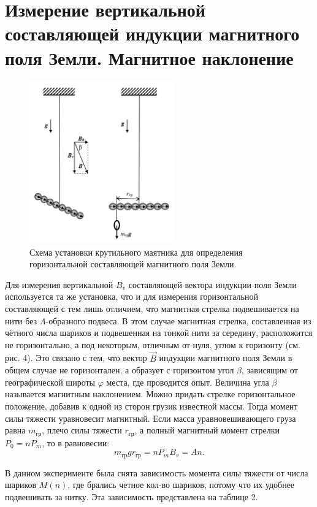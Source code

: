 \documentclass[a4paper, 14pt]{extarticle}%
\newcommand\ECaption[1]{%
     \captionsetup{font=footnotesize}%
     \caption{#1}}
\begin{document}
\section*{Измерение вертикальной составляющей
индукции магнитного поля Земли.
Магнитное наклонение}

\begin{figure}
\begin{center}
\includegraphics[height=7cm]{vert.png}
\end{center}
\ECaption{Схема установки крутильного маятника для определения горизонтальной составляющей магнитного поля Земли.}
\end{figure}

Для измерения вертикальной $B_v$ составляющей вектора индукции поля Земли используется
та же установка, что и для измерения горизонтальной составляющей с тем лишь отличием,
что магнитная стрелка подвешивается на нити
без $\Lambda$-образного подвеса. В этом случае магнитная стрелка, составленная из чётного числа
шариков и подвешенная на тонкой нити за середину, расположится не горизонтально, а под некоторым, отличным от нуля, углом к горизонту
(см. рис. 4). Это связано с тем, что вектор $\vec{B}$
индукции магнитного поля Земли в общем случае не горизонтален, а образует с горизонтом
угол $\beta$, зависящим от географической широты $\varphi$
места, где проводится опыт. Величина угла $\beta$
называется магнитным наклонением. Можно придать стрелке горизонтальное положение, добавив к одной из сторон грузик известной массы. Тогда момент силы тяжести уравновесит магнитный.
Если масса уравновешивающего
груза равна $m_{\text{гр}}$, плечо силы тяжести $r_{\text{гр}}$, а полный магнитный момент стрелки $P_0 = nP_m$, то
в равновесии: 
\[m_{\text{гр}}gr_{\text{гр}} = nP_mB_v = An.\]

В данном эксперименте была снята зависимость момента силы тяжести от числа шариков $M(n)$, где брались четное кол-во шариков, потому что их удобнее подвешивать за нитку. Эта зависимость представлена на таблице 
2.
\end{document}
